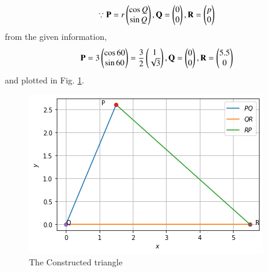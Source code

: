 \begin{align}
    \because \mathbf{P} = r\begin{pmatrix}\cos Q\\ \sin Q\end{pmatrix}, \mathbf{Q} = \begin{pmatrix}0\\0\end{pmatrix}, \mathbf{R} = \begin{pmatrix}p\\0\end{pmatrix}
    \end{align}
    from the given information, 
    \begin{align}
    \mathbf{P} = 3\begin{pmatrix}\cos60\\ \sin60\end{pmatrix} = \frac{3}{2}\begin{pmatrix}1\\\sqrt3\end{pmatrix},  \mathbf{Q} = \begin{pmatrix}0\\0\end{pmatrix},  \mathbf{R} = \begin{pmatrix}5.5\\0\end{pmatrix}
    \end{align}
and plotted in Fig.              \ref{constr/july/1Figure}.
    
    
\begin{figure}[!ht]
\centering
         \includegraphics[width= \columnwidth]{solutions/july/2/1/figure1.png}
         \caption{The Constructed triangle}
         \label{constr/july/1Figure}
\end{figure}





